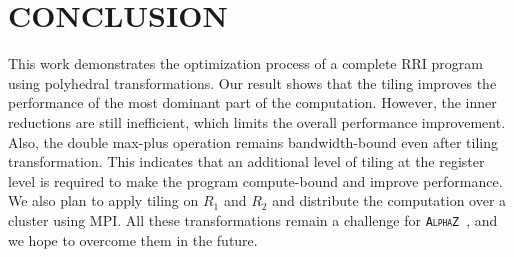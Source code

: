 \documentclass[conference]{IEEEtran}
\newcommand{\alphaz}{\textsc{\texttt{AlphaZ}}}
\begin{document}





\section{\uppercase{CONCLUSION}}
This work demonstrates the optimization process of a complete RRI program using polyhedral transformations. Our result shows that the tiling improves the performance of the most dominant part of the computation. However, the inner reductions are still inefficient, which limits the overall performance improvement. Also, the double max-plus operation remains bandwidth-bound even after tiling transformation. This indicates that an additional level of tiling at the register level is required to make the program compute-bound and improve performance.  We also plan to apply tiling on $R_1$ and $R_2$ and distribute the computation over a cluster using  MPI. All these transformations remain a challenge for \alphaz\ , and we hope to overcome them in the future.




%
%
%




\end{document}
